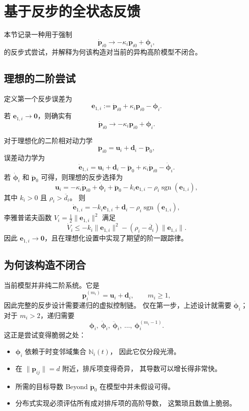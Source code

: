 \section{基于反步的全状态反馈}

本节记录一种用于强制
\[
\dot{\bm p}_{i0}\to -\kappa_i \bm p_{i0}+\bm\phi_i,
\]
的反步式尝试，并解释为何该构造对当前的异构高阶模型不闭合。

\subsection{理想的二阶尝试}

定义第一个反步误差为
\[
\bm e_{1,i}:=\dot{\bm p}_{i0}+\kappa_i\bm p_{i0}-\bm\phi_i.
\]
若 $\bm e_{1,i}\to\bm 0$，则确实有
\[
\dot{\bm p}_{i0}\to -\kappa_i\bm p_{i0}+\bm\phi_i.
\]

对于理想化的二阶相对动力学
\[
\ddot{\bm p}_{i0}=\bm u_i+\bm d_i-\ddot{\bm p}_0,
\]
误差动力学为
\[
\dot{\bm e}_{1,i}
=\bm u_i+\bm d_i-\ddot{\bm p}_0
 +\kappa_i\dot{\bm p}_{i0}-\dot{\bm\phi}_i.
\]
若 $\dot{\bm\phi}_i$ 和 $\ddot{\bm p}_0$ 可得，则理想的反步选择为
\[
\bm u_i
=-\kappa_i\dot{\bm p}_{i0}+\dot{\bm\phi}_i+\ddot{\bm p}_0
-k_i\bm e_{1,i}-\rho_i\operatorname{sgn}(\bm e_{1,i}),
\]
其中 $k_i>0$ 且 $\rho_i>\overline d_i$。
则
\[
\dot{\bm e}_{1,i}
=-k_i\bm e_{1,i}+\bm d_i-\rho_i\operatorname{sgn}(\bm e_{1,i}),
\]
李雅普诺夫函数 $V_i=\frac12\|\bm e_{1,i}\|^2$ 满足
\[
\dot V_i
\le -k_i\|\bm e_{1,i}\|^2-(\rho_i-\overline d_i)\|\bm e_{1,i}\|.
\]
因此 $\bm e_{1,i}\to\bm 0$，且在理想化设置中实现了期望的阶一跟踪律。

\subsection{为何该构造不闭合}

当前模型并非纯二阶系统。它是
\[
\bm p_i^{(m_i)}=\bm u_i+\bm d_i,
\qquad m_i\ge 1,
\]
因此完整的反步设计需要递归的虚拟控制链。
仅在第一步，上述设计就需要 $\dot{\bm\phi}_i$；
对于 $m_i>2$，递归需要
\[
\bm\phi_i,\ \dot{\bm\phi}_i,\ \ddot{\bm\phi}_i,\ \dots,\ \bm\phi_i^{(m_i-1)}.
\]
这正是尝试变得脆弱之处：

\begin{itemize}
    \item $\bm\phi_i$ 依赖于时变邻域集合 $\mathbb N_i(t)$，
          因此它仅分段光滑。
    \item 在 $\|\bm p_{ij}\|=d$ 附近，排斥项变得奇异，
          其导数可以增长得非常快。
    \item 所需的目标导数 Beyond $\ddot{\bm p}_0$ 在模型中并未假设可得。
    \item 分布式实现必须评估所有成对排斥项的高阶导数，
          这繁琐且数值上脆弱。
\end{itemize}

